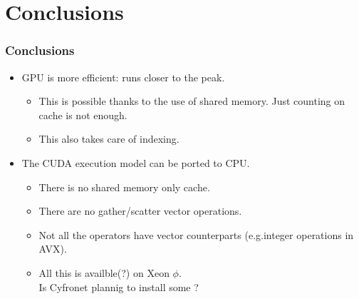 \documentclass{beamer}
\begin{document}
\section{Conclusions}

\begin{frame}
\frametitle{Conclusions}
\begin{itemize}
\item GPU is more efficient: runs closer to the peak.
\begin{itemize}
\item This is possible thanks to the use of shared memory. Just
  counting on cache is not enough.
\item This also takes care of indexing.
\end{itemize}
\item The CUDA execution model can be ported to CPU.
\begin{itemize}
\item There is no shared memory only cache.
\item There are no gather/scatter vector operations.
\item Not all the  operators have vector counterparts (e.g.integer operations in AVX).
\item All this is availble(?) on Xeon $\phi$. \\
Is Cyfronet plannig to install some ? 
\end{itemize}
\end{itemize}
\end{frame}
\end{document}

